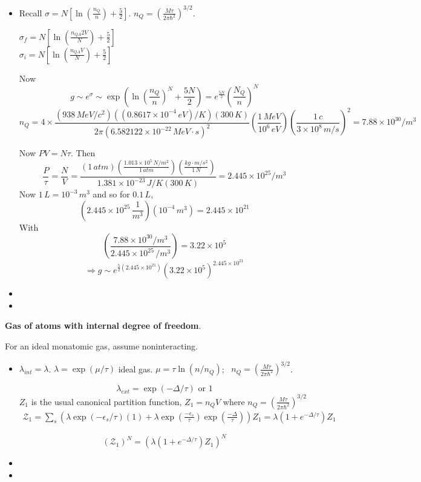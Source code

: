 \begin{itemize}
\item[(a)] Recall $\sigma = N [ \ln{ \left( \frac{ n_Q}{ n} \right)  + \frac{5}{2}  }]$.  $n_Q = \left( \frac{ M \tau}{2\pi \hbar^2} \right)^{3/2}$.  

$\sigma_f = N [ \ln{ \left( \frac{ n_{QA} 2 V }{ N} \right) + \frac{5}{2} } ]$ \\
$\sigma_i = N [ \ln{ \left( \frac{n_{QA} V}{N} \right) + \frac{5}{2} } ]$

Now
\[
g \sim e^{\sigma} \sim \exp{ \left( \ln{ \left( \frac{n_Q}{n} \right)^N} + \frac{5N}{2} \right)} = e^{\frac{5N}{2}} \left( \frac{N_Q}{n} \right)^N
\]
\[
n_Q = 4 \times \frac{ (938 \, MeV/c^2)( (0.8617 \times 10^{-4} \, eV)/K)(300 \, K) }{ 2 \pi (6.582122 \times 10^{-22} \, MeV \cdot s )^2 } \left( \frac{ 1 \, MeV}{ 10^6 \, eV } \right) \left( \frac{ 1 \, c }{ 3\times 10^8 \, m/s } \right)^2 = 7.88 \times 10^{30}/m^3
\]

Now $PV = N\tau$.  Then
\[
\frac{ P}{\tau} = \frac{N}{V} = \frac{ ( 1 \, atm )( \frac{ 1.013 \times 10^5 \, N/m^2 }{ 1 \, atm} ) \left( \frac{ kg \cdot m/s^2 }{ 1 \, N } \right) }{ 1.381 \times 10^{-23} \, J/K  (300 \, K ) } = 2.445 \times 10^{25} / m^3
\]
Now $1 \, L = 10^{-3} \, m^3$ and so for $0.1 \, L$, 
\[
(2.445 \times 10^{25} \, \frac{1}{m^3} ) ( 10^{-4}\, m^3 ) = 2.445 \times 10^{21} 
\]
With 
\[
\left( \frac{ 7.88 \times 10^{30} / m^3}{ 2.445 \times 10^{25} \, /m^3 } \right) = 3.22 \times 10^5
\]
\[
\Longrightarrow g \sim e^{ \frac{5}{2} ( 2.445 \times 10^{21} ) } (3.22 \times 10^5 )^{2.445 \times 10^{21} }
\]
\item[(b)]
\item[(c)]
\end{itemize}






 \textbf{Gas of atoms with internal degree of freedom}.  

For an ideal monatomic gas, assume noninteracting.  
\begin{itemize}
\item[(a)] $\lambda_{int} = \lambda$.   $\lambda = \exp{(\mu /\tau)}$ ideal gas.  $\mu = \tau \ln{ ( n/n_Q)}$; \quad \, $n_Q = \left( \frac{ M\tau}{ 2 \pi \hbar^2} \right)^{3/2}$.  

\[
\boxed{ \lambda_{ext} = \exp{ (-\Delta/\tau)} \text{ or } 1  }
\]
$Z_1$ is the usual canonical partition function, $Z_1 = n_Q V$ where $n_Q = \left( \frac{M\tau}{ 2 \pi \hbar^2 } \right)^{3/2}$  
\[
\begin{gathered}
  \mathcal{Z}_1 = \sum_s ( \lambda \exp{ ( - \epsilon_s/\tau) } (1) + \lambda \exp{ \left( \frac{-\epsilon_s}{\tau} \right)} \exp{ \left( \frac{ - \Delta }{\tau} \right) } )Z_1  = \lambda ( 1 + e^{-\Delta/\tau } ) Z_1
\end{gathered}
\]

\[
( \mathcal{Z}_1 )^N = (\lambda ( 1 + e^{-\Delta/\tau} )Z_1)^N 
\]
\item[(b)]
\item[(c)]
\end{itemize}

